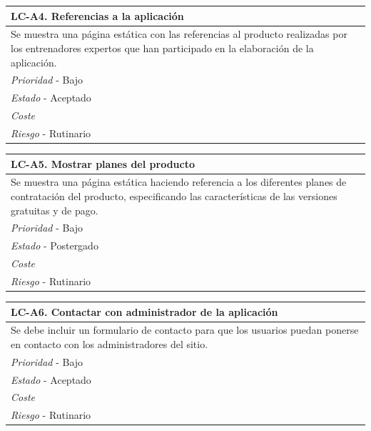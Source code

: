 	\begin{center}
		\begin{tabularx}{15cm}{|X|}
			\hline 
				\bf{LC-A4. Referencias a la aplicación}\\
			\hline
				Se muestra una página estática con las referencias al producto realizadas por los entrenadores expertos que han participado en la elaboración de la aplicación.\\
			\hline
				{\it Prioridad} - Bajo\\
			\hline
				{\it Estado} - Aceptado\\
			\hline
				{\it Coste}\\
			\hline
				{\it Riesgo} - Rutinario\\
			\hline
		\end{tabularx}
	\end{center}
	
	\begin{center}
		\begin{tabularx}{15cm}{|X|}
			\hline 
				\bf{LC-A5. Mostrar planes del producto}\\
			\hline
				Se muestra una página estática haciendo referencia a los diferentes planes de contratación del producto, especificando las características de las versiones gratuitas y de pago.\\
			\hline
				{\it Prioridad} - Bajo\\
			\hline
				{\it Estado} - Postergado\\
			\hline
				{\it Coste}\\
			\hline
				{\it Riesgo} - Rutinario\\
			\hline
		\end{tabularx}
	\end{center}		

	\begin{center}
		\begin{tabularx}{15cm}{|X|}
			\hline 
				\bf{LC-A6. Contactar con administrador de la aplicación}\\
			\hline
				Se debe incluir un formulario de contacto para que los usuarios puedan ponerse en contacto con los administradores del sitio.\\
			\hline
				{\it Prioridad} - Bajo\\
			\hline
				{\it Estado} - Aceptado\\
			\hline
				{\it Coste}\\
			\hline
				{\it Riesgo} - Rutinario\\
			\hline
		\end{tabularx}
	\end{center}
	
